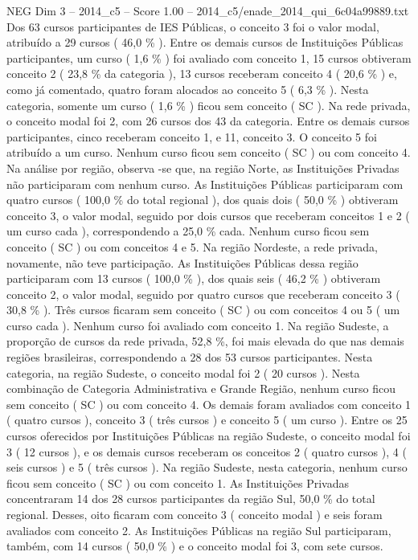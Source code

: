 \begin{textsample}{NEG Dim 3 – 2014\_c5 – Score 1.00 – 2014\_c5/enade\_2014\_qui\_6c04a99889.txt}
Dos 63 cursos participantes de IES Públicas, o conceito 3 foi o valor modal, atribuído a 29 cursos ( 46,0 \% ).
Entre os demais cursos de Instituições Públicas participantes, um curso ( 1,6 \% ) foi avaliado com conceito 1, 15 cursos obtiveram conceito 2 ( 23,8 \% da categoria ), 13 cursos receberam conceito 4 ( 20,6 \% ) e, como já comentado, quatro foram alocados ao conceito 5 ( 6,3 \% ).
Nesta categoria, somente um curso ( 1,6 \% ) ficou sem conceito ( SC ).
Na rede privada, o conceito modal foi 2, com 26 cursos dos 43 da categoria.
Entre os demais cursos participantes, cinco receberam conceito 1, e 11, conceito 3.
O conceito 5 foi atribuído a um curso.
Nenhum curso ficou sem conceito ( SC ) ou com conceito 4.
Na análise por região, observa -se que, na região Norte, as Instituições Privadas não participaram com nenhum curso.
As Instituições Públicas participaram com quatro cursos ( 100,0 \% do total regional ), dos quais dois ( 50,0 \% ) obtiveram conceito 3, o valor modal, seguido por dois cursos que receberam conceitos 1 e 2 ( um curso cada ), correspondendo a 25,0 \% cada.
Nenhum curso ficou sem conceito ( SC ) ou com conceitos 4 e 5.
Na região Nordeste, a rede privada, novamente, não teve participação.
As Instituições Públicas dessa região participaram com 13 cursos ( 100,0 \% ), dos quais seis ( 46,2 \% ) obtiveram conceito 2, o valor modal, seguido por quatro cursos que receberam conceito 3 ( 30,8 \% ).
Três cursos ficaram sem conceito ( SC ) ou com conceitos 4 ou 5 ( um curso cada ).
Nenhum curso foi avaliado com conceito 1.
Na região Sudeste, a proporção de cursos da rede privada, 52,8 \%, foi mais elevada do que nas demais regiões brasileiras, correspondendo a 28 dos 53 cursos participantes.
Nesta categoria, na região Sudeste, o conceito modal foi 2 ( 20 cursos ).
Nesta combinação de Categoria Administrativa e Grande Região, nenhum curso ficou sem conceito ( SC ) ou com conceito 4.
Os demais foram avaliados com conceito 1 ( quatro cursos ), conceito 3 ( três cursos ) e conceito 5 ( um curso ).
Entre os 25 cursos oferecidos por Instituições Públicas na região Sudeste, o conceito modal foi 3 ( 12 cursos ), e os demais cursos receberam os conceitos 2 ( quatro cursos ), 4 ( seis cursos ) e 5 ( três cursos ).
Na região Sudeste, nesta categoria, nenhum curso ficou sem conceito ( SC ) ou com conceito 1.
As Instituições Privadas concentraram 14 dos 28 cursos participantes da região Sul, 50,0 \% do total regional.
Desses, oito ficaram com conceito 3 ( conceito modal ) e seis foram avaliados com conceito 2.
As Instituições Públicas na região Sul participaram, também, com 14 cursos ( 50,0 \% ) e o conceito modal foi 3, com sete cursos.

\end{textsample}
